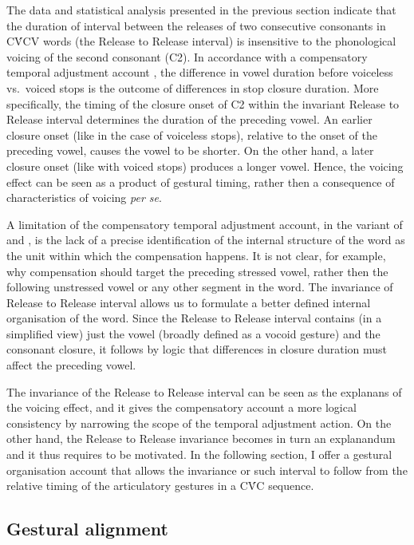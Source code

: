 \documentclass[preprint]{JASAnew}
\begin{document}
The data and statistical analysis presented in the previous section
indicate that the duration of interval between the releases of two
consecutive consonants in CV́CV words (the Release to Release interval)
is insensitive to the phonological voicing of the second consonant (C2).
In accordance with a compensatory temporal adjustment account
\citep{slis1969, lehiste1970}, the difference in vowel duration before
voiceless vs.~voiced stops is the outcome of differences in stop closure
duration. More specifically, the timing of the closure onset of C2
within the invariant Release to Release interval determines the duration
of the preceding vowel. An earlier closure onset (like in the case of
voiceless stops), relative to the onset of the preceding vowel, causes
the vowel to be shorter. On the other hand, a later closure onset (like
with voiced stops) produces a longer vowel. Hence, the voicing effect
can be seen as a product of gestural timing, rather then a consequence
of characteristics of voicing \emph{per se}.

A limitation of the compensatory temporal adjustment account, in the
variant of \citet{slis1969} and \citet{lehiste1970}, is the lack of a
precise identification of the internal structure of the word as the unit
within which the compensation happens. It is not clear, for example, why
compensation should target the preceding stressed vowel, rather then the
following unstressed vowel or any other segment in the word. The
invariance of Release to Release interval allows us to formulate a
better defined internal organisation of the word. Since the Release to
Release interval contains (in a simplified view) just the vowel (broadly
defined as a vocoid gesture) and the consonant closure, it follows by
logic that differences in closure duration must affect the preceding
vowel.

The invariance of the Release to Release interval can be seen as the
explanans of the voicing effect, and it gives the compensatory account a
more logical consistency by narrowing the scope of the temporal
adjustment action. On the other hand, the Release to Release invariance
becomes in turn an explanandum and it thus requires to be motivated. In
the following section, I offer a gestural organisation account that
allows the invariance or such interval to follow from the relative
timing of the articulatory gestures in a CV́C sequence.

\hypertarget{gestural-alignment}{%
\subsection{Gestural alignment}\label{gestural-alignment}}
\end{document}
